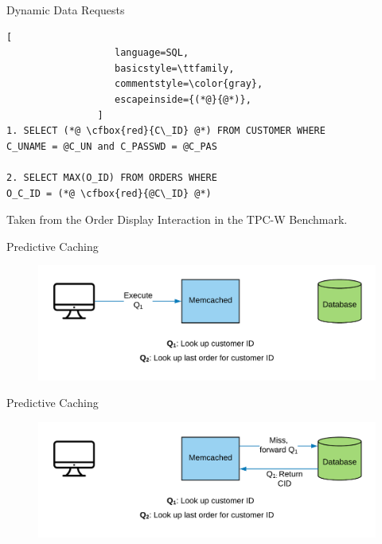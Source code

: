 \documentclass[10pt]{beamer}
\newcommand{\cfbox}[2]{%
    \colorlet{currentcolor}{.}%
    {\color{#1}%
    \fbox{\color{currentcolor}#2}}%
}
\begin{document}
\begin{frame}[fragile]{Dynamic Data Requests}
    \begin{lstlisting}[
                   language=SQL,
                   basicstyle=\ttfamily,
                   commentstyle=\color{gray},
                   escapeinside={(*@}{@*)},
                ]
1. SELECT (*@ \cfbox{red}{C\_ID} @*) FROM CUSTOMER WHERE 
C_UNAME = @C_UN and C_PASSWD = @C_PAS

2. SELECT MAX(O_ID) FROM ORDERS WHERE
O_C_ID = (*@ \cfbox{red}{@C\_ID} @*)
    \end{lstlisting}

\begin{center}
\tiny{Taken from the Order Display Interaction in the TPC-W Benchmark.}
\end{center}
\end{frame}

\begin{frame}{Predictive Caching}
    \begin{figure}
        \center
        \includegraphics[scale=0.17]{apollo_predictive_execution}
    \end{figure}
\end{frame}

\begin{frame}{Predictive Caching}
    \begin{figure}
        \center
        \includegraphics[scale=0.17]{apollo_predictive_execution_2}
    \end{figure}
\end{frame}
\end{document}
